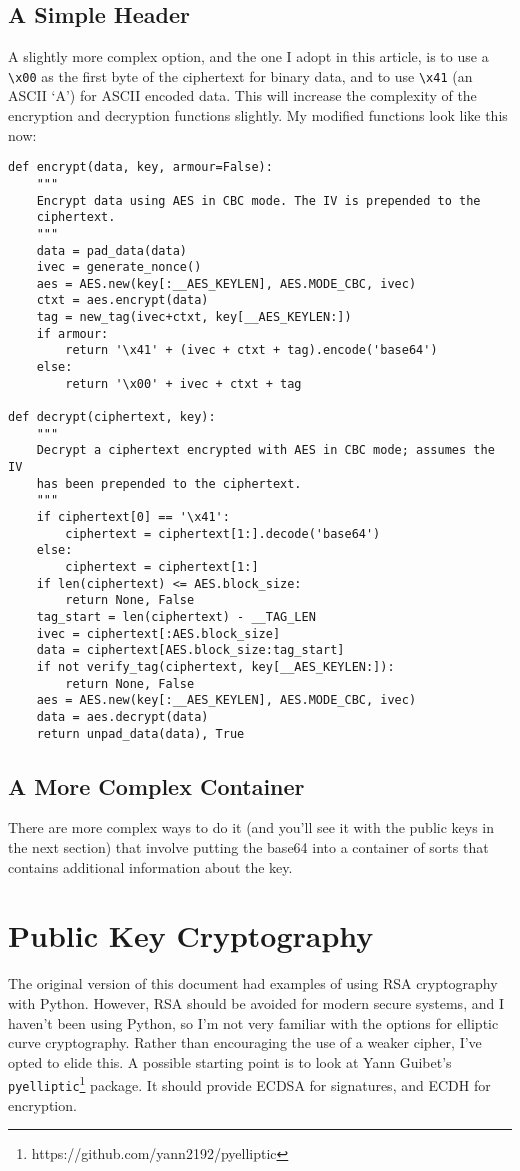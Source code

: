 \documentclass[letterpaper,10pt]{article}
\begin{document}
\subsection{A Simple Header}
A slightly more complex option, and the one I adopt in this article,
is to use a \verb|\x00| as the first byte of the ciphertext for
binary data, and to use \verb|\x41| (an ASCII `A') for ASCII encoded
data. This will increase the complexity of the encryption and
decryption functions slightly. My modified functions look like this
now:

\begin{verbatim}
def encrypt(data, key, armour=False):
    """
    Encrypt data using AES in CBC mode. The IV is prepended to the
    ciphertext.
    """
    data = pad_data(data)
    ivec = generate_nonce()
    aes = AES.new(key[:__AES_KEYLEN], AES.MODE_CBC, ivec)
    ctxt = aes.encrypt(data)
    tag = new_tag(ivec+ctxt, key[__AES_KEYLEN:])
    if armour:
        return '\x41' + (ivec + ctxt + tag).encode('base64')
    else:
        return '\x00' + ivec + ctxt + tag

def decrypt(ciphertext, key):
    """
    Decrypt a ciphertext encrypted with AES in CBC mode; assumes the IV
    has been prepended to the ciphertext.
    """
    if ciphertext[0] == '\x41':
        ciphertext = ciphertext[1:].decode('base64')
    else:
        ciphertext = ciphertext[1:]
    if len(ciphertext) <= AES.block_size:
        return None, False
    tag_start = len(ciphertext) - __TAG_LEN
    ivec = ciphertext[:AES.block_size]
    data = ciphertext[AES.block_size:tag_start]
    if not verify_tag(ciphertext, key[__AES_KEYLEN:]):
        return None, False
    aes = AES.new(key[:__AES_KEYLEN], AES.MODE_CBC, ivec)
    data = aes.decrypt(data)
    return unpad_data(data), True
\end{verbatim}

\subsection{A More Complex Container}
There are more complex ways to do it (and you’ll see it with the
public keys in the next section) that involve putting the base64
into a container of sorts that contains additional information about
the key.


\section{Public Key Cryptography}
The original version of this document had examples of using RSA
cryptography with Python. However, RSA should be avoided for modern
secure systems, and I haven't been using Python, so I'm not very
familiar with the options for elliptic curve cryptography. Rather
than encouraging the use of a weaker cipher, I've opted to elide
this. A possible starting point is to look at Yann Guibet's
\verb|pyelliptic|\footnote{https://github.com/yann2192/pyelliptic} package.
It should provide ECDSA for signatures, and ECDH for encryption.
\end{document}
